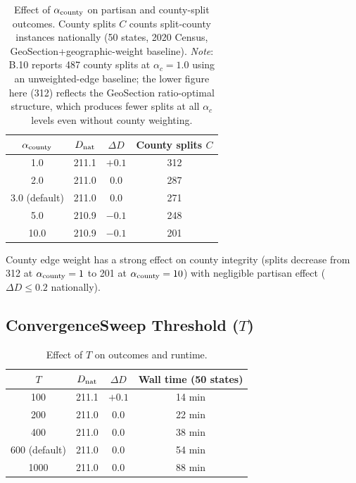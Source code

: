 \begin{table}[h]
\centering
\caption{Effect of $\alpha_{\mathrm{county}}$ on partisan and county-split outcomes.
         County splits $C$ counts split-county instances nationally (50 states,
         2020 Census, GeoSection+geographic-weight baseline).
         \emph{Note}: B.10 reports 487 county splits at $\alpha_c=1.0$ using
         an unweighted-edge baseline; the lower figure here (312) reflects the
         GeoSection ratio-optimal structure, which produces fewer splits at
         all $\alpha_c$ levels even without county weighting.}
\label{tab:acounty-results}
\begin{tabular}{cccc}
\toprule
$\alpha_{\mathrm{county}}$ & $D_{\rm nat}$ & $\Delta D$ & County splits $C$ \\
\midrule
1.0  & 211.1 & $+0.1$ & 312 \\
2.0  & 211.0 & 0.0    & 287 \\
3.0 (default) & 211.0 & 0.0 & 271 \\
5.0  & 210.9 & $-0.1$ & 248 \\
10.0 & 210.9 & $-0.1$ & 201 \\
\bottomrule
\end{tabular}
\end{table}

County edge weight has a strong effect on county integrity (splits decrease
from 312 at $\alpha_{\mathrm{county}} = 1$ to 201 at $\alpha_{\mathrm{county}} = 10$) with negligible
partisan effect ($\Delta D \leq 0.2$ nationally).

\subsection{ConvergenceSweep Threshold ($T$)}

\begin{table}[h]
\centering
\caption{Effect of $T$ on outcomes and runtime.}
\label{tab:T-results}
\begin{tabular}{cccc}
\toprule
$T$ & $D_{\rm nat}$ & $\Delta D$ & Wall time (50 states) \\
\midrule
100  & 211.1 & $+0.1$ & 14 min \\
200  & 211.0 & 0.0    & 22 min \\
400  & 211.0 & 0.0    & 38 min \\
600 (default) & 211.0 & 0.0 & 54 min \\
1000 & 211.0 & 0.0    & 88 min \\
\bottomrule
\end{tabular}
\end{table}


